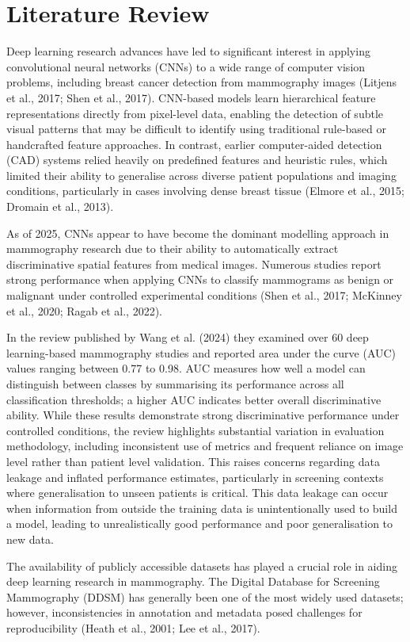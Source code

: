 \section{Literature Review}

Deep learning research advances have led to significant interest in applying convolutional neural networks (CNNs) to a wide range of computer vision problems, including breast cancer detection from mammography images (Litjens et al., 2017; Shen et al., 2017). CNN-based models learn hierarchical feature representations directly from pixel-level data, enabling the detection of subtle visual patterns that may be difficult to identify using traditional rule-based or handcrafted feature approaches. In contrast, earlier computer-aided detection (CAD) systems relied heavily on predefined features and heuristic rules, which limited their ability to generalise across diverse patient populations and imaging conditions, particularly in cases involving dense breast tissue (Elmore et al., 2015; Dromain et al., 2013).

As of 2025, CNNs appear to have become the dominant modelling approach in mammography research due to their ability to automatically extract discriminative spatial features from medical images. Numerous studies report strong performance when applying CNNs to classify mammograms as benign or malignant under controlled experimental conditions (Shen et al., 2017; McKinney et al., 2020; Ragab et al., 2022).

In the review published by Wang et al. (2024) they examined over 60 deep learning-based mammography studies and reported area under the curve (AUC) values ranging between 0.77 to 0.98. AUC measures how well a model can distinguish between classes by summarising its performance across all classification thresholds; a higher AUC indicates better overall discriminative ability. While these results demonstrate strong discriminative performance under controlled conditions, the review highlights substantial variation in evaluation methodology, including inconsistent use of metrics and frequent reliance on image level rather than patient level validation. This raises concerns regarding data leakage and inflated performance estimates, particularly in screening contexts where generalisation to unseen patients is critical. This data leakage can occur when information from outside the training data is unintentionally used to build a model, leading to unrealistically good performance and poor generalisation to new data.

The availability of publicly accessible datasets has played a crucial role in aiding deep learning research in mammography. The Digital Database for Screening Mammography (DDSM) has generally been one of the most widely used datasets; however, inconsistencies in annotation and metadata posed challenges for reproducibility (Heath et al., 2001; Lee et al., 2017).

